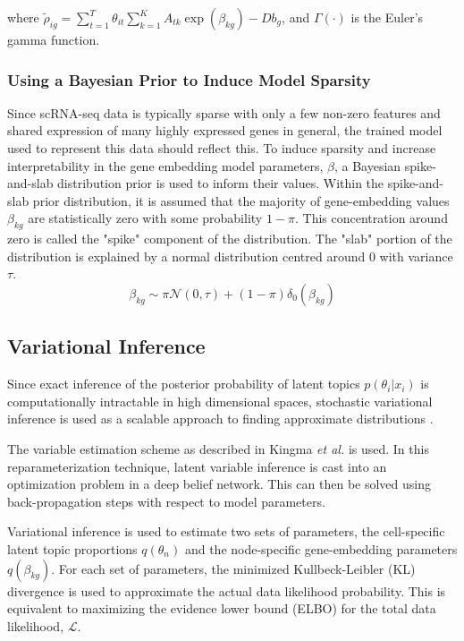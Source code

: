 where $\tilde{\rho}_{ig} = \sum_{t = 1}^T\theta_{it}\sum_{k = 1}^K A_{tk}\exp(\beta_{kg}) - Db_g$, and $\Gamma(\cdot)$ is the Euler's gamma function.

\subsubsection{Using a Bayesian Prior to Induce Model Sparsity}
Since scRNA-seq data is typically sparse with only a few non-zero features and shared expression of many highly expressed genes in general, the trained model used to represent this data should reflect this. To induce sparsity and increase interpretability in the gene embedding model parameters, $\beta$, a Bayesian spike-and-slab distribution prior \cite{Mitchell1988-yj} is used to inform their values. Within the spike-and-slab prior distribution, it is assumed that the majority of gene-embedding values $\beta_{kg}$ are statistically zero with some probability $1-\pi$. This concentration around zero is called the "spike" component of the distribution. The "slab" portion of the distribution is explained by a normal distribution centred around 0 with variance $\tau$. 
\begin{equation}
    \beta_{kg} \sim \pi \mathcal{N}(0,\tau) + (1 - \pi)\delta_0 (\beta_{kg})
\end{equation}




\subsection{Variational Inference}
Since exact inference of the posterior probability of latent topics $p(\theta_i | x_i)$ is computationally intractable in high dimensional spaces, stochastic variational inference is used as a scalable approach to finding approximate distributions \cite{Kingma2013-if}. 

The variable estimation scheme as described in Kingma \textit{et al.} is used\cite{Kingma2013-if}. In this reparameterization technique, latent variable inference is cast into an optimization problem in a deep belief network. This can then be solved using back-propagation steps with respect to model parameters. 

Variational inference is used to estimate two sets of parameters, the cell-specific latent topic proportions $q(\theta_n)$ and the node-specific gene-embedding parameters $q(\beta_{kg})$. For each set of parameters, the minimized Kullbeck-Leibler (KL) divergence is used to approximate the actual data likelihood probability. This is equivalent to maximizing the evidence lower bound (ELBO) for the total data likelihood, $\mathcal{L}$.

